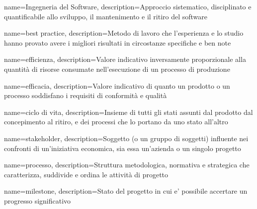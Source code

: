 {
	name={Ingegneria del Software},
	description={Approccio sistematico, disciplinato e quantificabile allo sviluppo, il mantenimento e il ritiro del software}
}

{
	name={best practice},
	description={Metodo di lavoro che l'esperienza e lo studio hanno provato avere i migliori risultati in circostanze specifiche e ben note}
}

{
	name=efficienza,
	description={Valore indicativo inversamente proporzionale alla quantità di risorse consumate nell'esecuzione di un processo di produzione}
}

{
	name=efficacia,
	description={Valore indicativo di quanto un prodotto o un processo soddisfano i requisiti di conformità e qualità}
}

{
	name={ciclo di vita},
	description={Insieme di tutti gli stati assunti dal prodotto dal concepimento al ritiro, e dei processi che lo portano da uno stato all'altro}
}

{
	name=stakeholder,
	description={Soggetto (o un gruppo di soggetti) influente nei confronti di un'iniziativa economica, sia essa un'azienda o un singolo progetto}
}

{
	name={processo},
	description={Struttura metodologica, normativa e strategica che caratterizza, suddivide e ordina le attività di progetto}
}

{
	name={milestone},
	description={Stato del progetto in cui e' possibile accertare un progresso significativo}
}